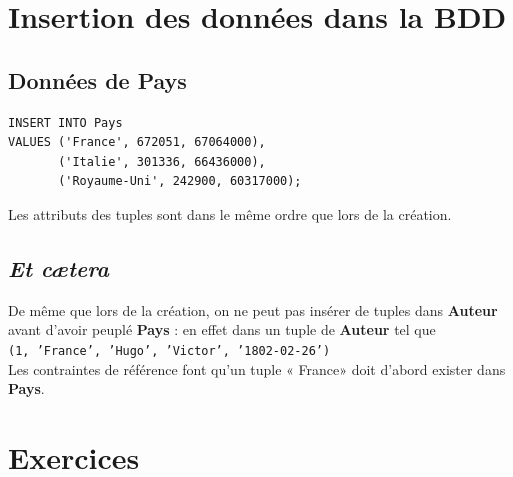 \section{Insertion des données dans la BDD}


\subsection{Données de \textbf{Pays}}
\begin{sql}
    \begin{verbatim}
INSERT INTO Pays
VALUES ('France', 672051, 67064000),
       ('Italie', 301336, 66436000),
       ('Royaume-Uni', 242900, 60317000);
\end{verbatim}
\end{sql}
Les attributs des tuples sont dans le même ordre que lors de la création.


\subsection{\textit{Et c\ae tera}}
De même que lors de la création, on ne peut pas insérer de tuples dans \textbf{Auteur} avant d'avoir peuplé \textbf{Pays} : en effet dans un tuple de \textbf{Auteur} tel que \\

\texttt{(1, 'France', 'Hugo', 'Victor', '1802-02-26')}\\

Les contraintes de référence font qu'un tuple « France» doit d'abord exister dans \textbf{Pays}.
\section{Exercices}

